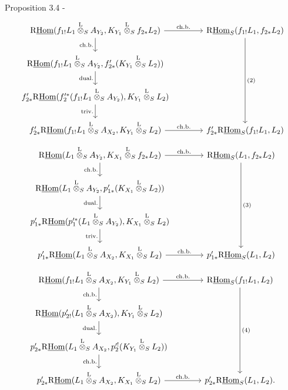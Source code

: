 \begin{statement}{Proposition 3.4 -}
\[\begin{tikzcd}[column sep=3.7em,row sep=1.7em]
\mathrm{R}\underline{\mathrm{Hom}}(f_{1!}L_1\overset{\mathrm{L}}{\otimes}_S A_{Y_2},K_{Y_1}\overset{\mathrm{L}}{\otimes}_S f_{2*}L_2)
  \arrow[r,"\mathrm{ch.b.}"] \arrow[d,"\mathrm{ch.b.}"']
& \mathrm{R}\underline{\mathrm{Hom}}_S(f_{1!}L_1,f_{2*}L_2) \arrow[ddd,"(2)"] \\
\mathrm{R}\underline{\mathrm{Hom}}(f_{1!}L_1\overset{\mathrm{L}}{\otimes}_S A_{Y_2},f'_{2*}(K_{Y_1}\overset{\mathrm{L}}{\otimes}_S L_2)) \arrow[d,"
\mathrm{dual.}"']
& \\
f'_{2*}\mathrm{R}\underline{\mathrm{Hom}}(f_2'^*(f_{1!}L_1\overset{\mathrm{L}}{\otimes}_S A_{Y_2}),K_{Y_1}\overset{\mathrm{L}}{\otimes}_S L_2) \arrow[d,"\mathrm{triv.}"']
& \\
f'_{2*}\mathrm{R}\underline{\mathrm{Hom}}(f_{1!}L_1\overset{\mathrm{L}}{\otimes}_S A_{X_2},K_{Y_1}\overset{\mathrm{L}}{\otimes}_S L_2) \arrow[r,"\mathrm{ch.b.}"]
& f'_{2*}\mathrm{R}\underline{\mathrm{Hom}}_S(f_{1!}L_1,L_2)
\end{tikzcd}
\]
\[
\begin{tikzcd}[column sep=3.7em,row sep=1.7em]
\mathrm{R}\underline{\mathrm{Hom}}(L_1\overset{\mathrm{L}}{\otimes}_S A_{Y_2},K_{X_1}\overset{\mathrm{L}}{\otimes}_S f_{2*}L_2)
  \arrow[r,"\mathrm{ch.b.}"] \arrow[d,"\mathrm{ch.b.}"']
& \mathrm{R}\underline{\mathrm{Hom}}_S(L_1,f_{2*}L_2) \arrow[ddd,"(3)"] \\
\mathrm{R}\underline{\mathrm{Hom}}(L_1\overset{\mathrm{L}}{\otimes}_S A_{Y_2},p'_{1*}(K_{X_1}\overset{\mathrm{L}}{\otimes}_S L_2)) \arrow[d,"\mathrm{dual.}"']
& \\
p'_{1*}\mathrm{R}\underline{\mathrm{Hom}}(p_1'^*(L_1\overset{\mathrm{L}}{\otimes}_S A_{Y_2}),K_{X_1}\overset{\mathrm{L}}{\otimes}_S L_2) \arrow[d,"\mathrm{triv.}"']
& \\
p'_{1*}\mathrm{R}\underline{\mathrm{Hom}}(L_1\overset{\mathrm{L}}{\otimes}_S A_{X_2},K_{X_1}\overset{\mathrm{L}}{\otimes}_S L_2) \arrow[r,"\mathrm{ch.b.}"]
& p'_{1*}\mathrm{R}\underline{\mathrm{Hom}}_S(L_1,L_2)
\end{tikzcd}
\]
\[
\begin{tikzcd}[column sep=3.7em,row sep=1.7em]
\mathrm{R}\underline{\mathrm{Hom}}(f_{1!}L_1\overset{\mathrm{L}}{\otimes}_S A_{X_2},K_{Y_1}\overset{\mathrm{L}}{\otimes}_S L_2)
  \arrow[r,"\mathrm{ch.b.}"] \arrow[d,"\mathrm{ch.b.}"']
& \mathrm{R}\underline{\mathrm{Hom}}_S(f_{1!}L_1,L_2) \arrow[ddd,"(4)"] \\
\mathrm{R}\underline{\mathrm{Hom}}(p'_{2!}(L_1\overset{\mathrm{L}}{\otimes}_S A_{X_2}),K_{Y_1}\overset{\mathrm{L}}{\otimes}_S L_2) \arrow[d,"\mathrm{dual.}"']
& \\
p'_{2*}\mathrm{R}\underline{\mathrm{Hom}}(L_1\overset{\mathrm{L}}{\otimes}_S A_{X_2},p_2'^!(K_{Y_1}\overset{\mathrm{L}}{\otimes}_S L_2)) \arrow[d,"\mathrm{ch.b.}"']
& \\
p'_{2*}\mathrm{R}\underline{\mathrm{Hom}}(L_1\overset{\mathrm{L}}{\otimes}_S A_{X_2},K_{X_1}\overset{\mathrm{L}}{\otimes}_S L_2) \arrow[r,"\mathrm{ch.b.}"]
& p'_{2*}\mathrm{R}\underline{\mathrm{Hom}}_S(L_1,L_2).
\end{tikzcd}
\]
\end{statement}
